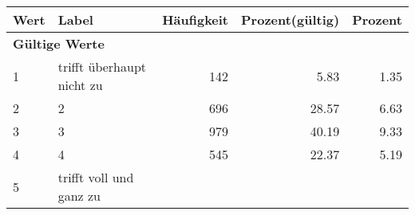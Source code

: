      \begin{longtable}{lXrrr}
     \toprule
     \textbf{Wert} & \textbf{Label} & \textbf{Häufigkeit} & \textbf{Prozent(gültig)} & \textbf{Prozent} \\
     \endhead
     \midrule
     \multicolumn{5}{l}{\textbf{Gültige Werte}}\\

     1 &
     \multicolumn{1}{X}{ trifft überhaupt nicht zu   } &


       \num{142} &
       \num[round-mode=places,round-precision=2]{5,83} &
         \num[round-mode=places,round-precision=2]{1,35} \\

     2 &
     \multicolumn{1}{X}{ 2   } &


       \num{696} &
       \num[round-mode=places,round-precision=2]{28,57} &
         \num[round-mode=places,round-precision=2]{6,63} \\

     3 &
     \multicolumn{1}{X}{ 3   } &


       \num{979} &
       \num[round-mode=places,round-precision=2]{40,19} &
         \num[round-mode=places,round-precision=2]{9,33} \\

     4 &
     \multicolumn{1}{X}{ 4   } &


       \num{545} &
       \num[round-mode=places,round-precision=2]{22,37} &
         \num[round-mode=places,round-precision=2]{5,19} \\

     5 &
     \multicolumn{1}{X}{ trifft voll und ganz zu   } &



\end{longtable}
